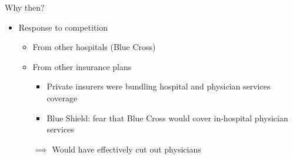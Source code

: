 \begin{frame}{Why then?}
{\begin{itemize}
            \item Response to competition
            \begin{itemize}
                \item From other hospitals (Blue Cross)
                \item From other insurance plans
                \begin{itemize}
                    \item Private insurers were bundling hospital and physician services coverage
                    \item Blue Shield: fear that Blue Cross would cover in-hospital physician services
                \end{itemize}
                $\implies$ Would have effectively cut out physicians
            \end{itemize}
        \end{itemize}
    }
    
\end{frame}


